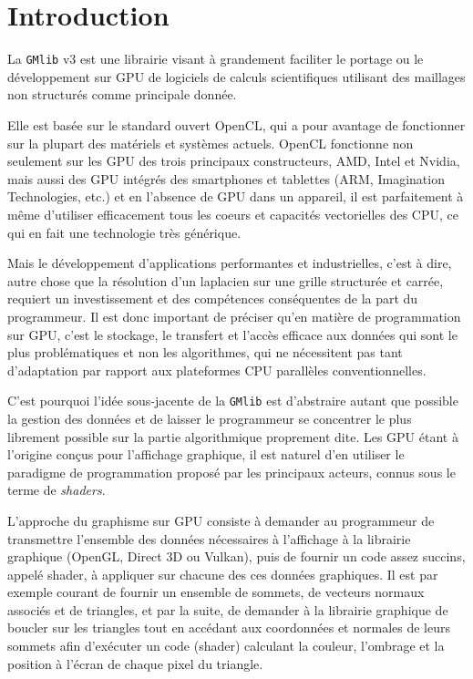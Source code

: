\documentclass[a4paper,12pt]{article}
\begin{document}
\clearpage


%
%


\section{Introduction}
La {\tt GMlib} v3 est une librairie visant à grandement faciliter le portage ou le développement sur GPU de logiciels de calculs scientifiques utilisant des maillages non structurés comme principale donnée.

Elle est basée sur le standard ouvert OpenCL, qui a pour avantage de fonctionner sur la plupart des matériels et systèmes actuels.
OpenCL fonctionne non seulement sur les GPU des trois principaux constructeurs, AMD, Intel et Nvidia, mais aussi des GPU intégrés des smartphones et tablettes (ARM, Imagination Technologies, etc.) et en l'absence de GPU dans un appareil, il est parfaitement à même d'utiliser efficacement tous les coeurs et capacités vectorielles des CPU, ce qui en fait une technologie très générique.

Mais le développement d'applications performantes et industrielles, c'est à dire, autre chose que la résolution d'un laplacien sur une grille structurée et carrée, requiert un investissement et des compétences conséquentes de la part du programmeur.
Il est donc important de préciser qu'en matière de programmation sur GPU, c'est le stockage, le transfert et l'accès efficace aux données qui sont le plus problématiques et non les algorithmes, qui ne nécessitent pas tant d'adaptation par rapport aux plateformes CPU parallèles conventionnelles.

C'est pourquoi l'idée sous-jacente de la {\tt GMlib} est d'abstraire autant que possible la gestion des données et de laisser le programmeur se concentrer le plus librement possible sur la partie algorithmique proprement dite.
Les GPU étant à l'origine conçus pour l'affichage graphique, il est naturel d'en utiliser le paradigme de programmation proposé par les principaux acteurs, connus sous le terme de \emph{shaders}.

L'approche du graphisme sur GPU consiste à demander au programmeur de transmettre l'ensemble des données nécessaires à l'affichage à la librairie graphique (OpenGL, Direct 3D ou Vulkan), puis de fournir un code assez succins, appelé shader, à appliquer sur chacune des ces données graphiques.
Il est par exemple courant de fournir un ensemble de sommets, de vecteurs normaux associés et de triangles, et par la suite, de demander à la librairie graphique de boucler sur les triangles tout en accédant aux coordonnées et normales de leurs sommets afin d'exécuter un code (shader) calculant la couleur, l'ombrage et la position à l'écran de chaque pixel du triangle.
\end{document}

